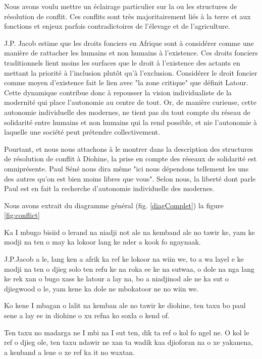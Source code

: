 \begin{paracol}{2}
Nous avons voulu mettre un éclairage particulier sur la ou les structures de résolution de conflit. Ces conflits sont très majoritairement liés à la terre et aux fonctions et enjeux parfois contradictoires de l'élevage et de l'agriculture.

J.P. Jacob\cite{jacob_terres_2007} estime que les droits fonciers en Afrique sont à considérer comme une manière de rattacher les humains et non humains à l'existence. Ces droits fonciers traditionnels lient moins les surfaces que le droit à l'existence des actants en mettant la priorité à l'inclusion plutôt qu'à l'exclusion. Considérer le droit foncier comme moyen d'existence fait le lien avec "la zone critique" que définit Latour\cite{latour_face_2015}. Cette dynamique contribue donc à repousser la vision individualiste de la modernité qui place l'autonomie au centre de tout. Or, de manière curieuse, cette autonomie individuelle des modernes, ne tient pas du tout compte du réseau de solidarité entre humains et non humains qui la rend possible, et nie l'autonomie à laquelle une société peut prétendre collectivement.

Pourtant, et nous nous  attachons à le montrer dans la description des structures de résolution de conflit à Diohine, la prise en compte des réseaux de solidarité est omniprésente. Paul Séné nous dira même "ici nous dépendons tellement les uns des autres qu'on est bien moins libres que vous". Selon nous, la liberté dont parle Paul est en fait la recherche d'autonomie individuelle des modernes.


Nous avons extrait du diagramme général (fig. \ref{diagComplet}) la figure \ref{fig:conflict}

\switchcolumn %

Ka I mbugo bisiid o lerand na niadji not ale na kemband ale no tawir ke, yam ke modji na ten o may ka lokoor lang ke nder a kook fo ngaynaak.

J.P.Jacob\cite{jacob_terres_2007} a le, lang ken a afrik ka ref ke lokoor na wiin we, to a wa layel e ke modji na ten o djieg solo ten refu ke na roka ee ke na sutwaa, o dole na nga lang ke rek xan o bugo xass ke latour a lay na, bo a niadjinod ale ne ka sut o djiegwood o le, yam kene ka dole ne mbokatoor ne no wiin we.

Ko kene I mbagan o lalit na kemban ale no tawir ke diohine, ten taxu bo paul sene a lay ee in diohine o xu refna ko soxla o kend of.

Ten taxu no madarga ne I mbi na I sut ten, dik ta ref o kol fo ngel ne.
O kol le ref o djieg ole, ten taxu ndawir ne xan ta wadik kaa djioforan na o xe yakanena, a kenband a lene o xe ref ka it no waxtan.



\end{paracol}

